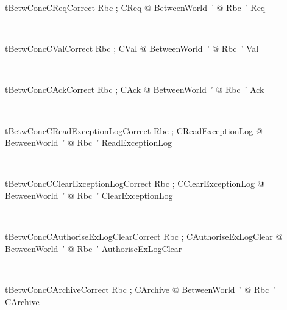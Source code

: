 \begin{LNewThm}
\begin{theorem}{tBetwConcCReqCorrect}
    \forall Rbc ; CReq @ \exists BetweenWorld~' @ Rbc~' \land Req %
\end{theorem}~\end{LNewThm}

\begin{LNewThm}
\begin{theorem}{tBetwConcCValCorrect}
    \forall Rbc ; CVal @ \exists BetweenWorld~' @ Rbc~' \land Val %
\end{theorem}~\end{LNewThm}

\begin{LNewThm}
\begin{theorem}{tBetwConcCAckCorrect}
    \forall Rbc ; CAck @ \exists BetweenWorld~' @ Rbc~' \land Ack %
\end{theorem}~\end{LNewThm}

\begin{LNewThm}
\begin{theorem}{tBetwConcCReadExceptionLogCorrect}
    \forall Rbc ; CReadExceptionLog @ \exists BetweenWorld~' @ Rbc~' \land ReadExceptionLog %
\end{theorem}~\end{LNewThm}

\begin{LNewThm}
\begin{theorem}{tBetwConcCClearExceptionLogCorrect}
    \forall Rbc ; CClearExceptionLog @ \exists BetweenWorld~' @ Rbc~' \land ClearExceptionLog %
\end{theorem}~\end{LNewThm}

\begin{LNewThm}
\begin{theorem}{tBetwConcCAuthoriseExLogClearCorrect}
    \forall Rbc ; CAuthoriseExLogClear @ \exists BetweenWorld~' @ Rbc~' \land AuthoriseExLogClear %
\end{theorem}~\end{LNewThm}

\begin{LNewThm}
\begin{theorem}{tBetwConcCArchiveCorrect}
    \forall Rbc ; CArchive @ \exists BetweenWorld~' @ Rbc~' \land CArchive %
\end{theorem}~\end{LNewThm}

